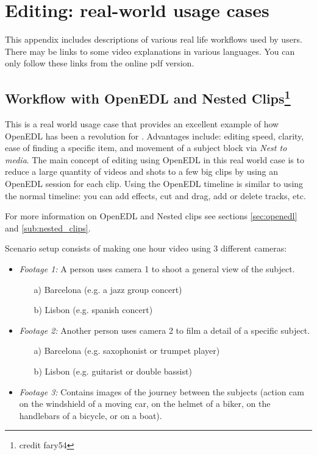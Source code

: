\chapter{Editing: real-world usage cases}%
\label{cha:editing_real_world_usage}

This appendix includes descriptions of various real life workflows used by \CGG{} users. There may be links to some video explanations in various languages.
You can only follow these links from the online pdf version.

\section{Workflow with OpenEDL and Nested Clips\protect\footnote{credit fary54}}%
\label{sec:workflow_openedl_nested_clips}

This is a real world usage case that provides an excellent example of how OpenEDL has been a
revolution for \CGG{}. Advantages include: editing speed, clarity, ease of finding a specific item,
and movement of a subject block via \textit{Nest to media}.
The main concept of editing using OpenEDL in this real world case is to
reduce a large quantity of videos and shots to a few big clips by using
an OpenEDL session for each clip. Using the OpenEDL timeline is similar to
 using the normal timeline: you can add effects, cut and drag, add or delete
tracks, etc.

For more information on OpenEDL and Nested clips see sections \ref{sec:openedl} and \ref{sub:nested_clips}.

Scenario setup consists of making one hour video using 3 different cameras:

\begin{itemize}
	\item \textit{Footage 1:} A person uses camera 1 to shoot a general view of the subject.
	\begin{enumerate}
		\item[a)] Barcelona (e.g. a jazz group concert)
		\item[b)] Lisbon (e.g. spanish concert)
	\end{enumerate}
	\item \textit{Footage 2:} Another person uses camera 2 to film a detail of a specific subject.
	\begin{enumerate}
		\item[a)] Barcelona (e.g. saxophonist or trumpet player)
		\item[b)] Lisbon (e.g. guitarist or double bassist)
	\end{enumerate}
	\item \textit{Footage 3:} Contains images of the journey between the subjects (action cam on the windshield of a moving car, on the helmet of a biker, on the handlebars of a bicycle, or on a boat).
\end{itemize}

